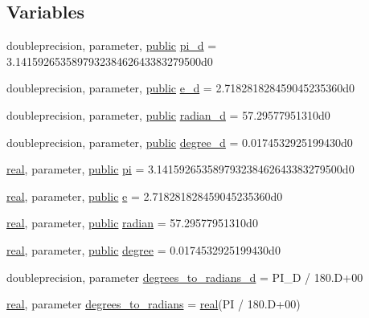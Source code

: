 \subsection*{Variables}
\begin{DoxyCompactItemize}
\item 
doubleprecision, parameter, \hyperlink{M__stopwatch_83_8txt_a2f74811300c361e53b430611a7d1769f}{public} \hyperlink{namespacem__units_a4c458c5da447708cb6e03ec4c3469dcd}{pi\+\_\+d} = 3.\+141592653589793238462643383279500d0
\item 
doubleprecision, parameter, \hyperlink{M__stopwatch_83_8txt_a2f74811300c361e53b430611a7d1769f}{public} \hyperlink{namespacem__units_a758f857fe2277b6576ffae5654544405}{e\+\_\+d} = 2.\+718281828459045235360d0
\item 
doubleprecision, parameter, \hyperlink{M__stopwatch_83_8txt_a2f74811300c361e53b430611a7d1769f}{public} \hyperlink{namespacem__units_ae88c8fb74ff03da879e668cfe0635550}{radian\+\_\+d} = 57.\+29577951310d0
\item 
doubleprecision, parameter, \hyperlink{M__stopwatch_83_8txt_a2f74811300c361e53b430611a7d1769f}{public} \hyperlink{namespacem__units_a00df65cb71220d4fe1c654d5b4ba4851}{degree\+\_\+d} = 0.\+0174532925199430d0
\item 
\hyperlink{read__watch_83_8txt_abdb62bde002f38ef75f810d3a905a823}{real}, parameter, \hyperlink{M__stopwatch_83_8txt_a2f74811300c361e53b430611a7d1769f}{public} \hyperlink{namespacem__units_a7f9e69ec2fe4e5a5c49f7dce15a48a67}{pi} = 3.\+141592653589793238462643383279500d0
\item 
\hyperlink{read__watch_83_8txt_abdb62bde002f38ef75f810d3a905a823}{real}, parameter, \hyperlink{M__stopwatch_83_8txt_a2f74811300c361e53b430611a7d1769f}{public} \hyperlink{namespacem__units_a14ea25237dbdbd5c868d2729c67b2abd}{e} = 2.\+718281828459045235360d0
\item 
\hyperlink{read__watch_83_8txt_abdb62bde002f38ef75f810d3a905a823}{real}, parameter, \hyperlink{M__stopwatch_83_8txt_a2f74811300c361e53b430611a7d1769f}{public} \hyperlink{namespacem__units_ae9442f0901c0238170aff7cf946fb0c1}{radian} = 57.\+29577951310d0
\item 
\hyperlink{read__watch_83_8txt_abdb62bde002f38ef75f810d3a905a823}{real}, parameter, \hyperlink{M__stopwatch_83_8txt_a2f74811300c361e53b430611a7d1769f}{public} \hyperlink{namespacem__units_a3ffc2cf87c0db17c71fa0a7bbee8eb9c}{degree} = 0.\+0174532925199430d0
\item 
doubleprecision, parameter \hyperlink{namespacem__units_a74de2022908d613a91b83f9521460f6f}{degrees\+\_\+to\+\_\+radians\+\_\+d} = P\+I\+\_\+D / 180.\+D+00
\item 
\hyperlink{read__watch_83_8txt_abdb62bde002f38ef75f810d3a905a823}{real}, parameter \hyperlink{namespacem__units_a37687a78d45e4bcf4fa6b76ca11eb02b}{degrees\+\_\+to\+\_\+radians} = \hyperlink{read__watch_83_8txt_abdb62bde002f38ef75f810d3a905a823}{real}(PI / 180.\+D+00)
\end{DoxyCompactItemize}


